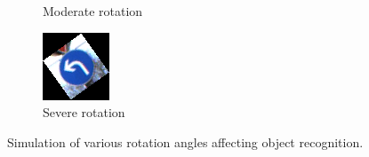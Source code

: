 \begin{figure}[H]
\begin{subfigure}{0.32\textwidth}
        \caption{Moderate rotation}
        \label{fig:subfig8}
    \end{subfigure}
    \begin{subfigure}{0.32\textwidth}
        \includegraphics[width=\linewidth]{images/figure13/3.png}
        \caption{Severe rotation}
        \label{fig:subfig9}
    \end{subfigure}
    \caption{Simulation of various rotation angles affecting object recognition.}
    \label{fig:fig13}
\end{figure}





